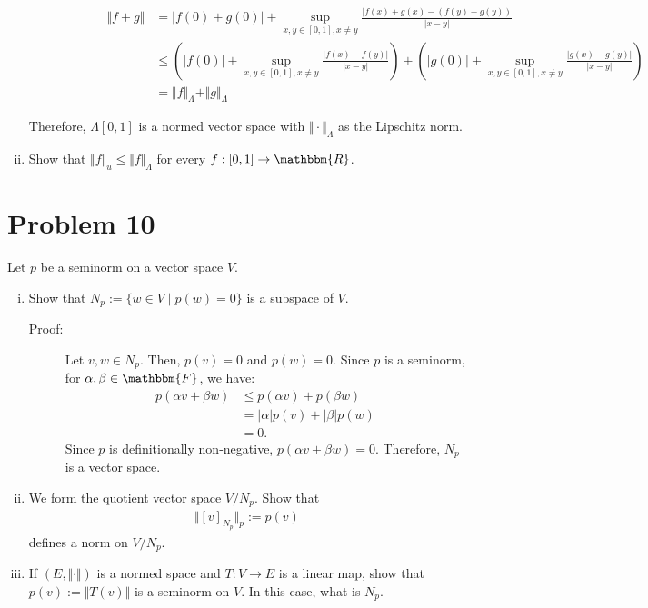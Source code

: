 \documentclass[10pt]{extarticle}
\newcommand{\R}{\mathbbm{R}}
\begin{document}
\begin{enumerate}[(i)]
\begin{description}
\begin{description}
              \begin{align*}
                \Vert f + g \Vert &= |f(0) + g(0)| + \sup_{x,y\in[0,1],x\neq y}\frac{|f(x)+g(x)-(f(y)+g(y))}{|x-y|}\\
                                  &\leq \left(|f(0)| + \sup_{x,y\in[0,1],x\neq y}\frac{|f(x)-f(y)|}{|x-y|}\right)+ \left(|g(0)| + \sup_{x,y\in[0,1],x\neq y}\frac{|g(x)-g(y)|}{|x-y|}\right)\\
                                  &= \Vert f\Vert_{\Lambda} + \Vert g \Vert_{\Lambda}
              \end{align*}
          \end{description}
      \end{description}
      Therefore, $\Lambda[0,1]$ is a normed vector space with $\Vert \cdot \Vert_{\Lambda}$ as the Lipschitz norm.
    \item Show that $\Vert f\Vert_u \leq \Vert f \Vert_{\Lambda}$ for every $f:[0,1]\rightarrow \R$.
  \end{enumerate}
  \section{Problem 10}%
  Let $p$ be a seminorm on a vector space $V$.
  \begin{enumerate}[(i)]
    \item Show that $N_p := \{w\in V\mid p(w)=0\}$ is a subspace of $V$.
      \begin{description}
        \item[Proof:] Let $v,w\in N_p$. Then, $p(v) = 0$ and $p(w) = 0$. Since $p$ is a seminorm, for $\alpha,\beta\in \mathbbm{F}$, we have:
          \begin{align*}
            p(\alpha v + \beta w) &\leq p(\alpha v) + p(\beta w)\\
                                  &= |\alpha| p(v) + |\beta|p(w)\\
                                  &= 0.
          \end{align*}
          Since $p$ is definitionally non-negative, $p(\alpha v + \beta w) = 0$. Therefore, $N_p$ is a vector space.
      \end{description}
    \item We form the quotient vector space $V/N_p$. Show that
      \begin{align*}
        \Vert [v]_{N_p}\Vert_{p} := p(v)
      \end{align*}
      defines a norm on $V/N_p$.
    \item If $(E,\Vert\cdot\Vert)$ is a normed space and $T: V\rightarrow E$ is a linear map, show that $p(v) := \Vert T(v)\Vert$ is a seminorm on $V$. In this case, what is $N_p$.
  \end{enumerate}
\end{document}
